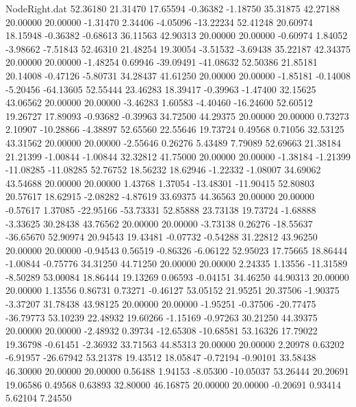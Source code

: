 \begin{filecontents}{NodeRight.dat}
  52.36180   21.31470   17.65594    -0.36382   -1.18750   35.31875   42.27188   20.00000   20.00000   -1.31470    2.34406   -4.05096  -13.22234
  52.41248   20.60974   18.15948    -0.36382   -0.68613   36.11563   42.90313   20.00000   20.00000   -0.60974    1.84052   -3.98662   -7.51843
  52.46310   21.48254   19.30054    -3.51532   -3.69438   35.22187   42.34375   20.00000   20.00000   -1.48254    0.69946  -39.09491  -41.08632
  52.50386   21.85181   20.14008    -0.47126   -5.80731   34.28437   41.61250   20.00000   20.00000   -1.85181   -0.14008   -5.20456  -64.13605
  52.55444   23.46283   18.39417    -0.39963   -1.47400   32.15625   43.06562   20.00000   20.00000   -3.46283    1.60583   -4.40460  -16.24600
  52.60512   19.26727   17.89093    -0.93682   -0.39963   34.72500   44.29375   20.00000   20.00000    0.73273    2.10907  -10.28866   -4.38897
  52.65560   22.55646   19.73724     0.49568    0.71056   32.53125   43.31562   20.00000   20.00000   -2.55646    0.26276    5.43489    7.79089
  52.69663   21.38184   21.21399    -1.00844   -1.00844   32.32812   41.75000   20.00000   20.00000   -1.38184   -1.21399  -11.08285  -11.08285
  52.76752   18.56232   18.62946    -1.22332   -1.08007   34.69062   43.54688   20.00000   20.00000    1.43768    1.37054  -13.48301  -11.90415
  52.80803   20.57617   18.62915    -2.08282   -4.87619   33.69375   44.36563   20.00000   20.00000   -0.57617    1.37085  -22.95166  -53.73331
  52.85888   23.73138   19.73724    -1.68888   -3.33625   30.28438   43.76562   20.00000   20.00000   -3.73138    0.26276  -18.55637  -36.65670
  52.90974   20.94543   19.43481    -0.07732   -0.54288   31.22812   43.96250   20.00000   20.00000   -0.94543    0.56519   -0.86326   -6.06122
  52.95023   17.75665   18.86444    -1.00844   -0.75776   34.31250   44.71250   20.00000   20.00000    2.24335    1.13556  -11.31589   -8.50289
  53.00084   18.86444   19.13269     0.06593   -0.04151   34.46250   44.90313   20.00000   20.00000    1.13556    0.86731    0.73271   -0.46127
  53.05152   21.95251   20.37506    -1.90375   -3.37207   31.78438   43.98125   20.00000   20.00000   -1.95251   -0.37506  -20.77475  -36.79773
  53.10239   22.48932   19.60266    -1.15169   -0.97263   30.21250   44.39375   20.00000   20.00000   -2.48932    0.39734  -12.65308  -10.68581
  53.16326   17.79022   19.36798    -0.61451   -2.36932   33.71563   44.85313   20.00000   20.00000    2.20978    0.63202   -6.91957  -26.67942
  53.21378   19.43512   18.05847    -0.72194   -0.90101   33.58438   46.30000   20.00000   20.00000    0.56488    1.94153   -8.05300  -10.05037
  53.26444   20.20691   19.06586     0.49568    0.63893   32.80000   46.16875   20.00000   20.00000   -0.20691    0.93414    5.62104    7.24550

\end{filecontents}
